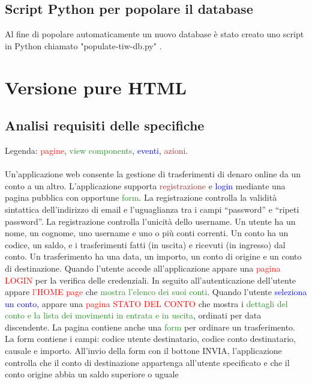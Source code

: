 \documentclass{article}
\begin{document}
\subsection{Script Python per popolare il database}
Al fine di popolare automaticamente un nuovo database è stato creato uno script in Python chiamato "populate-tiw-db.py" .

\section{Versione pure HTML}

\subsection{Analisi requisiti delle specifiche}
Legenda: \textcolor{red}{pagine}, \textcolor{ForestGreen}{view components}, \textcolor{blue}{eventi}, \textcolor{brown}{azioni}.
\\
\\
Un’applicazione web consente la gestione di trasferimenti di denaro online da un conto a un
altro. L’applicazione supporta  \textcolor{brown}{registrazione} e  \textcolor{blue}{login} mediante una pagina pubblica con
opportune  \textcolor{ForestGreen}{form}. La registrazione controlla la validità sintattica dell’indirizzo di email e
l’uguaglianza tra i campi “password” e “ripeti password”. La registrazione controlla l’unicità
dello username. Un utente ha un nome, un cognome, uno username e uno o più conti correnti.
Un conto ha un codice, un saldo, e i trasferimenti fatti (in uscita) e ricevuti (in ingresso) dal
conto. Un trasferimento ha una data, un importo, un conto di origine e un conto di destinazione.
Quando l’utente accede all’applicazione appare una  \textcolor{red}{pagina LOGIN} per la verifica delle
credenziali. In seguito all’autenticazione dell’utente appare \textcolor{red}{l’HOME page} che \textcolor{ForestGreen}{mostra l’elenco
dei suoi conti}. Quando l’utente  \textcolor{blue}{seleziona un conto}, appare una \textcolor{red}{pagina STATO DEL CONTO}
che mostra i \textcolor{ForestGreen}{dettagli del conto e la lista dei movimenti in entrata e in uscita}, ordinati per data
discendente. La pagina contiene anche una \textcolor{ForestGreen}{form} per ordinare un trasferimento. La form
contiene i campi: codice utente destinatario, codice conto destinatario, causale e importo.
All’invio della form con il bottone INVIA, l’applicazione controlla che il conto di destinazione
appartenga all’utente specificato e che il conto origine abbia un saldo superiore o uguale
\end{document}
